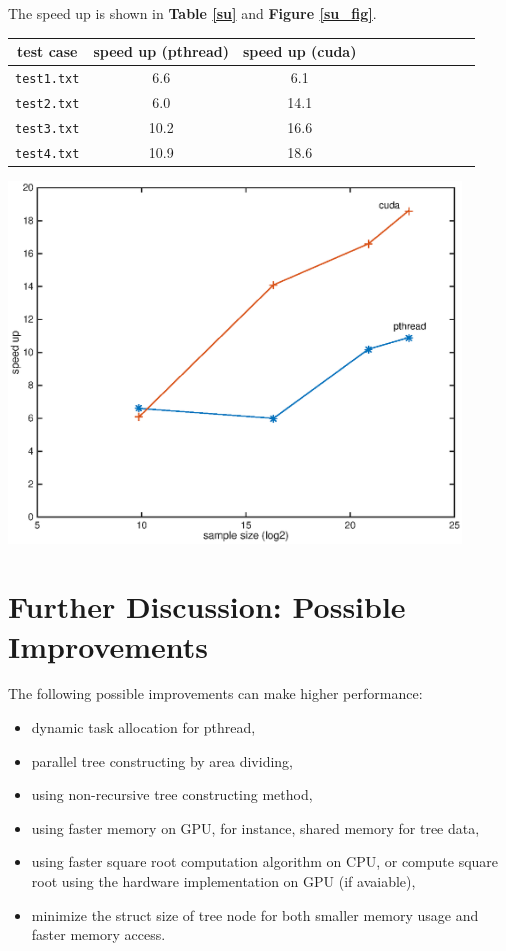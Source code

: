 \documentclass[11pt, a4paper]{article}
\makeatletter
\newcommand\fcaption{\def\@captype{figure}\caption}
\newcommand\tcaption{\def\@captype{table}\caption}
\newcommand{\fref}[1]{\textbf{Figure \ref{#1}}}
\newcommand{\tref}[1]{\textbf{Table \ref{#1}}}
\makeatother
\begin{document}
The speed up is shown in \tref{su} and \fref{su_fig}.

\begin{center}
    \tcaption{Speed up for the test cases}\label{su}
    \begin{tabular}{ccccccccccc}
        \toprule
        test case & speed up (pthread) & speed up (cuda) \\
        \midrule
        \texttt{test1.txt} & 6.6 & 6.1 \\
        \texttt{test2.txt} & 6.0 & 14.1 \\
        \texttt{test3.txt} & 10.2 & 16.6 \\
        \texttt{test4.txt} & 10.9 & 18.6 \\
        \bottomrule
    \end{tabular}
\end{center}

\begin{center}
    \includegraphics[width=12cm]{su}
    \fcaption{Speed up for the test cases}\label{su_fig}
\end{center}

\section{Further Discussion: Possible Improvements}

The following possible improvements can make higher performance:

\begin{itemize}
    \item dynamic task allocation for pthread,
    \item parallel tree constructing by area dividing,
    \item using non-recursive tree constructing method,
    \item using faster memory on GPU, for instance, shared memory for tree data,
    \item using faster square root computation algorithm on CPU, or compute square root using the hardware implementation on GPU (if avaiable),
    \item minimize the struct size of tree node for both smaller memory usage and faster memory access.
\end{itemize}
\end{document}
